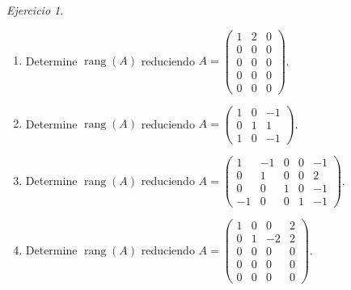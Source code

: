 \documentclass[12pt]{article}
\theoremstyle{remark}
\newtheorem{Ejer}[definicion]{Ejercicio}
\newcommand{\rang}{\operatorname{rang}}
\begin{document}
\begin{Ejer}
\begin{enumerate}[resume=banco]
\item Determine $\rang(A)$ reduciendo $A=\begin{pmatrix}1&2&0\\0&0&0\\0&0&0\\0&0&0\\0&0&0\end{pmatrix}$.

\item Determine $\rang(A)$ reduciendo $A=\begin{pmatrix}1&0&-1\\0&1&1\\1&0&-1\end{pmatrix}$.

\item Determine $\rang(A)$ reduciendo $A=\begin{pmatrix}1&-1&0&0&-1\\0&1&0&0&2\\0&0&1&0&-1\\-1&0&0&1&-1\end{pmatrix}$.

\item Determine $\rang(A)$ reduciendo $A=\begin{pmatrix}1&0&0&2\\0&1&-2&2\\0&0&0&0\\0&0&0&0\\0&0&0&0\end{pmatrix}$.
\end{enumerate}
\end{Ejer}
\end{document}
